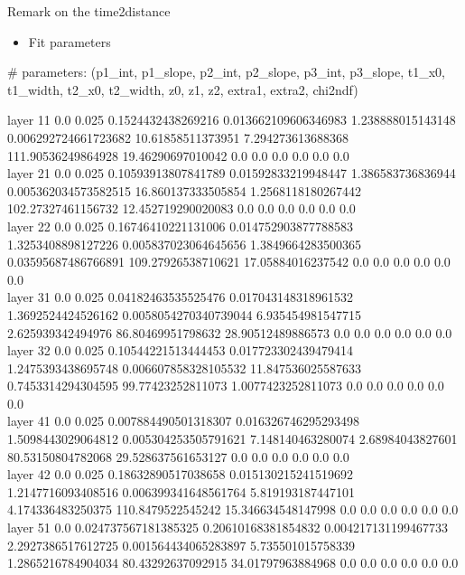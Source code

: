 \documentclass[10pt,aspectratio=43]{beamer}
\begin{document}
\begin{frame}{Remark on the time2distance}
    \begin{itemize}
        \item Fit parameters
    \end{itemize}

    \vspace{0.5cm}

    { \scriptsize

    {\color{red} \# parameters:} (p1\_int, p1\_slope, p2\_int, p2\_slope, p3\_int, p3\_slope, t1\_x0, t1\_width, t2\_x0, t2\_width, z0, z1, z2, extra1, extra2, chi2ndf)

    {\color{red} layer 11} 0.0   0.025   0.1524432438269216   0.013662109606346983   1.238888015143148   0.006292724661723682   10.61858511373951   7.294273613688368   111.90536249864928   19.46290697010042   0.0 0.0 0.0 0.0 0.0 0.0\\

    {\color{red} layer 21} 0.0   0.025   0.10593913807841789   0.01592833219948447   1.386583736836944   0.005362034573582515   16.860137333505854   1.2568118180267442   102.27327461156732   12.452719290020083   0.0 0.0 0.0 0.0 0.0 0.0\\

    {\color{red} layer 22} 0.0   0.025   0.16746410221131006   0.014752903877788583   1.3253408898127226   0.005837023064645656   1.3849664283500365   0.03595687486766891   109.27926538710621   17.05884016237542   0.0 0.0 0.0 0.0 0.0 0.0\\

    {\color{red} layer 31} 0.0   0.025   0.04182463535525476   0.017043148318961532   1.3692524424526162   0.0058054270340739044   6.935454981547715   2.625939342494976   86.80469951798632   28.90512489886573   0.0 0.0 0.0 0.0 0.0 0.0\\

    {\color{red} layer 32} 0.0   0.025   0.10544221513444453   0.017723302439479414   1.2475393438695748   0.006607858328105532   11.847536025587633   0.7453314294304595   99.77423252811073   1.0077423252811073   0.0 0.0 0.0 0.0 0.0 0.0\\

    {\color{red} layer 41} 0.0   0.025   0.007884490501318307   0.016326746295293498   1.5098443029064812   0.005304253505791621   7.148140463280074   2.68984043827601   80.53150804782068   29.528637561653127   0.0 0.0 0.0 0.0 0.0 0.0\\

    {\color{red} layer 42} 0.0   0.025   0.18632890517038658   0.015130215241519692   1.2147716093408516   0.006399341648561764   5.819193187447101   4.174336483250375   110.8479522545242   15.346634548147998   0.0 0.0 0.0 0.0 0.0 0.0\\

    {\color{red} layer 51} 0.0   0.024737567181385325   0.20610168381854832   0.004217131199467733   2.2927386517612725   0.001564434065283897   5.735501015758339   1.2865216784904034   80.43292637092915   34.01797963884968   0.0 0.0 0.0 0.0 0.0 0.0
    }

\end{frame}
\end{document}
